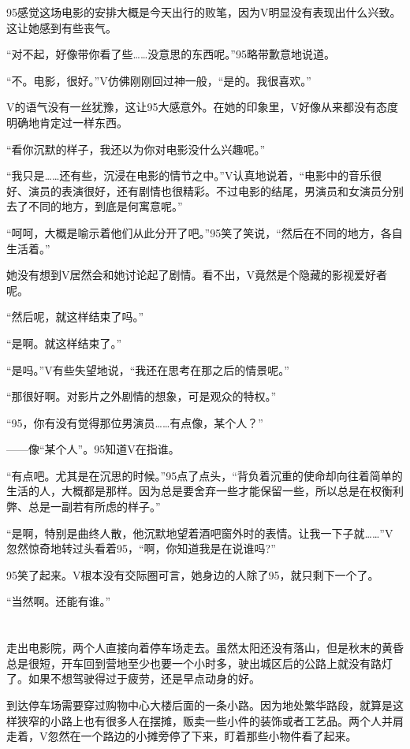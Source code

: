 95感觉这场电影的安排大概是今天出行的败笔，因为V明显没有表现出什么兴致。这让她感到有些丧气。

“对不起，好像带你看了些……没意思的东西呢。”95略带歉意地说道。

“不。电影，很好。”V仿佛刚刚回过神一般，“是的。我很喜欢。”

V的语气没有一丝犹豫，这让95大感意外。在她的印象里，V好像从来都没有态度明确地肯定过一样东西。

“看你沉默的样子，我还以为你对电影没什么兴趣呢。”

“我只是……还有些，沉浸在电影的情节之中。”V认真地说着，“电影中的音乐很好、演员的表演很好，还有剧情也很精彩。不过电影的结尾，男演员和女演员分别去了不同的地方，到底是何寓意呢。”

“呵呵，大概是喻示着他们从此分开了吧。”95笑了笑说，“然后在不同的地方，各自生活着。”

她没有想到V居然会和她讨论起了剧情。看不出，V竟然是个隐藏的影视爱好者呢。

“然后呢，就这样结束了吗。”

“是啊。就这样结束了。”

“是吗。”V有些失望地说，“我还在思考在那之后的情景呢。”

“那很好啊。对影片之外剧情的想象，可是观众的特权。”

“95，你有没有觉得那位男演员……有点像，某个人？”

——像“某个人”。95知道V在指谁。

“有点吧。尤其是在沉思的时候。”95点了点头，“背负着沉重的使命却向往着简单的生活的人，大概都是那样。因为总是要舍弃一些才能保留一些，所以总是在权衡利弊、总是一副若有所虑的样子。”

“是啊，特别是曲终人散，他沉默地望着酒吧窗外时的表情。让我一下子就……”V忽然惊奇地转过头看着95，“啊，你知道我是在说谁吗?”

95笑了起来。V根本没有交际圈可言，她身边的人除了95，就只剩下一个了。

“当然啊。还能有谁。”



\section*{}

走出电影院，两个人直接向着停车场走去。虽然太阳还没有落山，但是秋末的黄昏总是很短，开车回到营地至少也要一个小时多，驶出城区后的公路上就没有路灯了。如果不想驾驶得过于疲劳，还是早点动身的好。

到达停车场需要穿过购物中心大楼后面的一条小路。因为地处繁华路段，就算是这样狭窄的小路上也有很多人在摆摊，贩卖一些小件的装饰或者工艺品。两个人并肩走着，V忽然在一个路边的小摊旁停了下来，盯着那些小物件看了起来。

